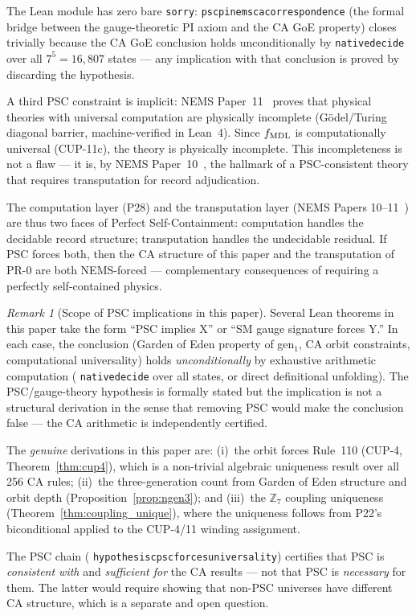 \documentclass[11pt]{article}
\theoremstyle{remark}
\newtheorem{remark}[theorem]{Remark}
\newcommand{\lean}[1]{%
  \penalty-100
  \begingroup\def\_{\textunderscore\allowbreak}\texttt{#1}\endgroup}
\begin{document}
The Lean module has zero bare \texttt{sorry}: \lean{psc\_pi\_nems\_ca\_correspondence}
(the formal bridge between the gauge-theoretic PI axiom and the CA GoE property)
closes trivially because the CA GoE conclusion holds unconditionally by
\lean{native\_decide} over all $7^5 = 16{,}807$ states --- any implication with
that conclusion is proved by discarding the hypothesis.

A third PSC constraint is implicit: NEMS Paper~11~\cite{SpivackUGP2024} proves that
physical theories with universal computation are physically incomplete (G\"{o}del/Turing
diagonal barrier, machine-verified in Lean~4). Since $f_{\rm MDL}$ is computationally
universal (CUP-11c), the theory is physically incomplete. This incompleteness is not a
flaw --- it is, by NEMS Paper~10~\cite{SpivackUGP2024}, the hallmark of a PSC-consistent theory that requires
transputation for record adjudication.

The computation layer (P28) and the transputation layer (NEMS Papers 10--11~\cite{SpivackUGP2024}) are thus
two faces of Perfect Self-Containment: computation handles the decidable record structure;
transputation handles the undecidable residual. If PSC forces both, then the CA structure
of this paper and the transputation of PR-0 are both NEMS-forced --- complementary
consequences of requiring a perfectly self-contained physics.

\begin{remark}[Scope of PSC implications in this paper]
Several Lean theorems in this paper take the form ``PSC implies X'' or ``SM gauge signature
forces Y.'' In each case, the conclusion (Garden of Eden property of gen$_1$, CA orbit
constraints, computational universality) holds \emph{unconditionally} by exhaustive
arithmetic computation (\lean{native\_decide} over all states, or direct definitional
unfolding). The PSC/gauge-theory hypothesis is formally stated but the implication is not
a structural derivation in the sense that removing PSC would make the conclusion false ---
the CA arithmetic is independently certified.

The \emph{genuine} derivations in this paper are: (i)~the orbit forces Rule~110 (CUP-4,
Theorem~\ref{thm:cup4}), which is a non-trivial algebraic uniqueness result over all 256
CA rules; (ii)~the three-generation count from Garden of Eden structure and orbit depth
(Proposition~\ref{prop:ngen3}); and (iii)~the $\mathbb{Z}_7$ coupling uniqueness
(Theorem~\ref{thm:coupling_unique}), where the uniqueness follows from P22's biconditional
applied to the CUP-4/11 winding assignment.

The PSC chain (\lean{hypothesis\_c\_psc\_forces\_universality})
certifies that PSC is \emph{consistent with} and \emph{sufficient for} the CA results ---
not that PSC is \emph{necessary} for them. The latter would require showing that non-PSC
universes have different CA structure, which is a separate and open question.
\end{remark}
\end{document}
